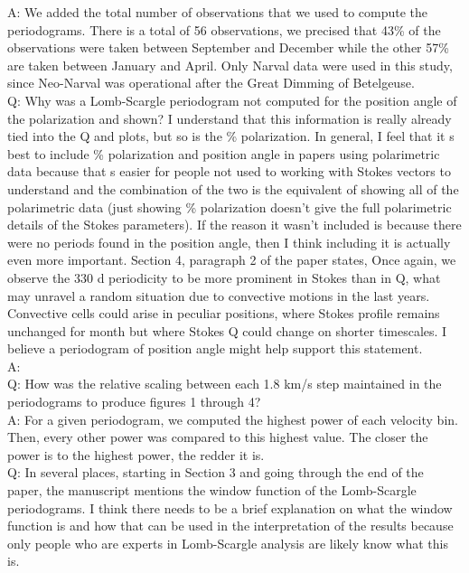 \documentclass{article}
\begin{document}
A: We added the total number of observations that we used to compute the periodograms. There is a total of 56 observations, we precised that 43\% of the observations were taken between September and December while the other 57\% are taken between January and April. Only Narval data were used in this study, since Neo-Narval was operational after the Great Dimming of Betelgeuse.\\ 

Q: Why was a Lomb-Scargle periodogram not computed for the position angle of the polarization
and shown? I understand that this information is really already tied into the Q and plots, but
so is the \% polarization. In general, I feel that it s best to include \% polarization and position angle
in papers using polarimetric data because that s easier for people not used to working with
Stokes vectors to understand and the combination of the two is the equivalent of showing all of the polarimetric data (just showing \% polarization doesn’t give the full polarimetric details of the
Stokes parameters). If the reason it wasn’t included is because there were no periods found in
the position angle, then I think including it is actually even more important. Section 4, paragraph
2 of the paper states, Once again, we observe the 330 d periodicity to be more prominent in
Stokes than in Q, what may unravel a random situation due to convective motions in the last
years. Convective cells could arise in peculiar positions, where Stokes profile remains
unchanged for month but where Stokes Q could change on shorter timescales. I believe a
periodogram of position angle might help support this statement.\\

A: \\

Q: How was the relative scaling between each 1.8 km/s step maintained in the periodograms to
produce figures 1 through 4?\\

A: For a given periodogram, we computed the highest power of each velocity bin. Then, every other power was compared to this highest value. The closer the power is to the highest power, the redder it is.  \\

Q: In several places, starting in Section 3 and going through the end of the paper, the manuscript
mentions the window function of the Lomb-Scargle periodograms. I think there needs to be a
brief explanation on what the window function is and how that can be used in the interpretation
of the results because only people who are experts in Lomb-Scargle analysis are likely know
what this is.\\
\end{document}
